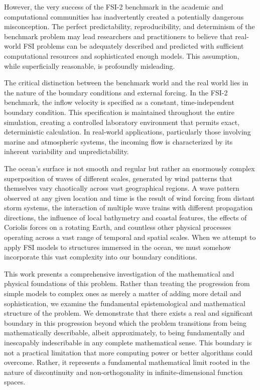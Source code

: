 ﻿\documentclass[a4paper,11pt]{article}
\theoremstyle{definition}
\begin{document}
However, the very success of the FSI-2 benchmark in the academic and computational communities has inadvertently created a potentially dangerous misconception. The perfect predictability, reproducibility, and determinism of the benchmark problem may lead researchers and practitioners to believe that real-world FSI problems can be adequately described and predicted with sufficient computational resources and sophisticated enough models. This assumption, while superficially reasonable, is profoundly misleading.

The critical distinction between the benchmark world and the real world lies in the nature of the boundary conditions and external forcing. In the FSI-2 benchmark, the inflow velocity is specified as a constant, time-independent boundary condition. This specification is maintained throughout the entire simulation, creating a controlled laboratory environment that permits exact, deterministic calculation. In real-world applications, particularly those involving marine and atmospheric systems, the incoming flow is characterized by its inherent variability and unpredictability.

The ocean's surface is not smooth and regular but rather an enormously complex superposition of waves of different scales, generated by wind patterns that themselves vary chaotically across vast geographical regions. A wave pattern observed at any given location and time is the result of wind forcing from distant storm systems, the interaction of multiple wave trains with different propagation directions, the influence of local bathymetry and coastal features, the effects of Coriolis forces on a rotating Earth, and countless other physical processes operating across a vast range of temporal and spatial scales. When we attempt to apply FSI models to structures immersed in the ocean, we must somehow incorporate this vast complexity into our boundary conditions.

This work presents a comprehensive investigation of the mathematical and physical foundations of this problem. Rather than treating the progression from simple models to complex ones as merely a matter of adding more detail and sophistication, we examine the fundamental epistemological and mathematical structure of the problem. We demonstrate that there exists a real and significant boundary in this progression beyond which the problem transitions from being mathematically describable, albeit approximately, to being fundamentally and inescapably indescribable in any complete mathematical sense. This boundary is not a practical limitation that more computing power or better algorithms could overcome. Rather, it represents a fundamental mathematical limit rooted in the nature of discontinuity and non-orthogonality in infinite-dimensional function spaces.
\end{document}
